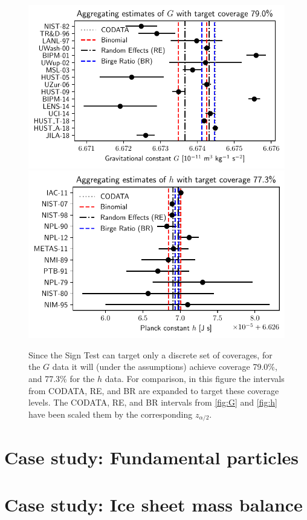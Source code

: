 \documentclass[letterpaper,12pt]{article}
\begin{document}
\begin{figure}[htbp]
\centering
\includegraphics{figs/G1.pdf}
\includegraphics{figs/h1.pdf}
\label{fig:Gh-wider}
\caption{Since the Sign Test can target only a discrete set of coverages, for the $G$ data it will (under the assumptions) achieve coverage 79.0\%, and 77.3\% for the $h$ data. For comparison, in this figure the intervals from CODATA, RE, and BR are expanded to target these coverage levels. The CODATA, RE, and BR intervals from \ref{fig:G} and \ref{fig:h} have been scaled them by the corresponding $z_{\alpha/2}$.}
\end{figure}

\section{Case study: Fundamental particles}\label{case-study-fundamental-particles}

\section{Case study: Ice sheet mass balance}\label{case-study-ice-sheet-mass-balance}
\end{document}
